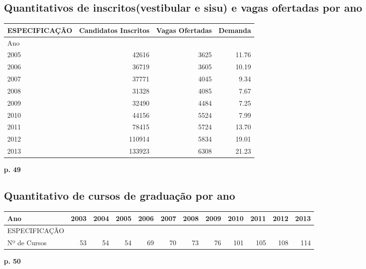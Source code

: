 \documentclass{report}
\begin{document}
\subsection{Quantitativos de inscritos(vestibular e sisu) e vagas ofertadas por ano}
\begin{tabular}{lrrr}
\toprule
ESPECIFICAÇÃO &  Candidatos Inscritos &  Vagas Ofertadas &  Demanda \\
\midrule
Ano  &                       &                  &          \\
2005 &  42616 &  3625 &  11.76 \\
2006 &  36719 &  3605 &  10.19 \\
2007 &  37771 &  4045 &  9.34 \\
2008 &  31328 &  4085 &  7.67 \\
2009 &  32490 &  4484 &  7.25 \\
2010 &  44156 &  5524 &  7.99 \\
2011 &  78415 &  5724 &  13.70 \\
2012 &  110914 &  5834 &  19.01 \\
2013 &  133923 &  6308 &  21.23 \\
\bottomrule
\end{tabular}

\textbf{p. 49}

\subsection{Quantitativo de cursos de graduação por ano}
\begin{tabular}{lrrrrrrrrrrr}
\toprule
Ano &  2003 &  2004 &  2005 &  2006 &  2007 &  2008 &  2009 &  2010 &  2011 &  2012 &  2013 \\
\midrule
ESPECIFICAÇÃO &       &       &       &       &       &       &       &       &       &       &       \\
Nº de Cursos  &  53 &  54 &  54 &  69 &  70 &  73 &  76 &  101 &  105 &  108 &  114 \\
\bottomrule
\end{tabular}

\textbf{p. 50}
\end{document}
